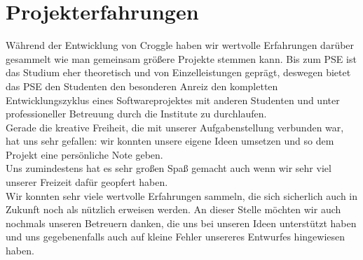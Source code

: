 \documentclass{scrartcl}
\begin{document}
	\section{Projekterfahrungen}

	Während der Entwicklung von Croggle haben wir wertvolle Erfahrungen darüber gesammelt wie man gemeinsam größere Projekte stemmen kann. Bis zum PSE ist das Studium eher theoretisch und von Einzelleistungen geprägt, deswegen bietet das PSE den Studenten den besonderen Anreiz den kompletten Entwicklungszyklus eines Softwareprojektes mit anderen Studenten und unter professioneller Betreuung durch die Institute zu durchlaufen. \\
	Gerade die kreative Freiheit, die mit unserer Aufgabenstellung verbunden war, hat uns sehr gefallen: wir konnten unsere eigene Ideen umsetzen und so dem Projekt eine persönliche Note geben. \\





	Uns zumindestens hat es sehr großen Spaß gemacht auch wenn wir sehr viel unserer Freizeit dafür geopfert haben. \\
	Wir konnten sehr viele wertvolle Erfahrungen sammeln, die sich sicherlich auch in Zukunft noch als nützlich erweisen werden. 	
	An dieser Stelle möchten wir auch nochmals unseren Betreuern danken, die uns bei unseren Ideen unterstützt haben und uns gegebenenfalls auch auf kleine Fehler unsereres Entwurfes hingewiesen haben. \\
     
\end{document}
